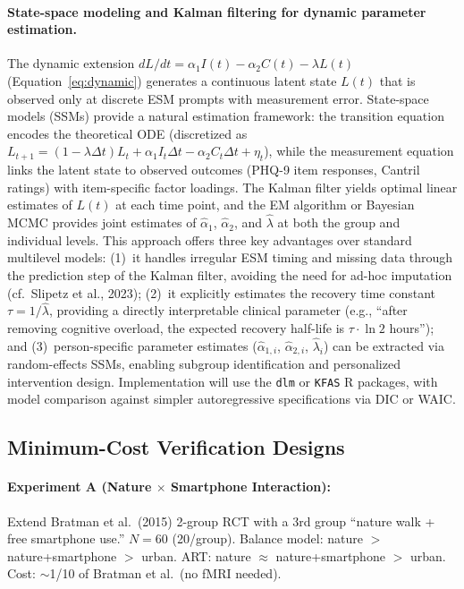 \documentclass[a4paper,11pt,titlepage]{article}
\begin{document}
\paragraph{State-space modeling and Kalman filtering for dynamic parameter estimation.}
The dynamic extension $dL/dt = \alpha_1 I(t) - \alpha_2 C(t) - \lambda L(t)$ (Equation~\ref{eq:dynamic}) generates a continuous latent state $L(t)$ that is observed only at discrete ESM prompts with measurement error. State-space models (SSMs) provide a natural estimation framework: the transition equation encodes the theoretical ODE (discretized as $L_{t+1} = (1 - \lambda \Delta t) L_t + \alpha_1 I_t \Delta t - \alpha_2 C_t \Delta t + \eta_t$), while the measurement equation links the latent state to observed outcomes (PHQ-9 item responses, Cantril ratings) with item-specific factor loadings. The Kalman filter yields optimal linear estimates of $L(t)$ at each time point, and the EM algorithm or Bayesian MCMC provides joint estimates of $\hat{\alpha}_1$, $\hat{\alpha}_2$, and $\hat{\lambda}$ at both the group and individual levels. This approach offers three key advantages over standard multilevel models: (1)~it handles irregular ESM timing and missing data through the prediction step of the Kalman filter, avoiding the need for ad-hoc imputation (cf.\ Slipetz et al., 2023); (2)~it explicitly estimates the recovery time constant $\tau = 1/\hat{\lambda}$, providing a directly interpretable clinical parameter (e.g., ``after removing cognitive overload, the expected recovery half-life is $\tau \cdot \ln 2$ hours''); and (3)~person-specific parameter estimates ($\hat{\alpha}_{1,i}$, $\hat{\alpha}_{2,i}$, $\hat{\lambda}_i$) can be extracted via random-effects SSMs, enabling subgroup identification and personalized intervention design. Implementation will use the \texttt{dlm} or \texttt{KFAS} R packages, with model comparison against simpler autoregressive specifications via DIC or WAIC.


\subsection{Minimum-Cost Verification Designs}

\paragraph{Experiment A (Nature $\times$ Smartphone Interaction):}
Extend Bratman et al.~(2015) 2-group RCT with a 3rd group ``nature walk + free smartphone use.'' $N = 60$ (20/group). Balance model: nature $>$ nature+smartphone $>$ urban. ART: nature $\approx$ nature+smartphone $>$ urban. Cost: $\sim$1/10 of Bratman et al.\ (no fMRI needed).
\end{document}
